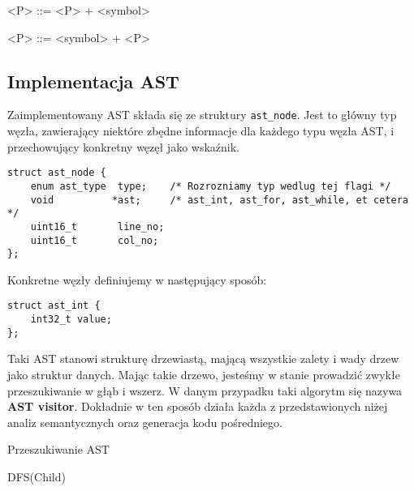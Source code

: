 			\begin{grammar}
			    <P> ::= <P> + <symbol>
	
			    <P> ::= <symbol> + <P>
			\end{grammar}

		\subsection{Implementacja AST}

			Zaimplementowany AST składa się ze struktury \texttt{ast_node}. Jest to główny typ
			węzła, zawierający niektóre zbędne informacje dla każdego typu węzła AST, i przechowujący
			konkretny węzęł jako wskaźnik.

			\spacing

\begin{lstlisting}[label={lst:ast-node}]
struct ast_node {
	enum ast_type  type;    /* Rozrozniamy typ wedlug tej flagi */
	void          *ast;     /* ast_int, ast_for, ast_while, et cetera */
	uint16_t       line_no;
	uint16_t       col_no;
};
\end{lstlisting}
			
			\spacing
			
			Konkretne węzły definiujemy w następujący sposób:

			\spacing

\begin{lstlisting}[label={lst:ast-concrete-node}]
struct ast_int {
	int32_t value;
};
\end{lstlisting}
			
			\spacing
			
			Taki AST stanowi strukturę drzewiastą, mającą wszystkie zalety i wady drzew jako struktur
			danych. Mając takie drzewo, jesteśmy w stanie prowadzić zwykłe przeszukiwanie w głąb
			i wszerz. W danym przypadku taki algorytm się nazywa \textbf{AST visitor}. Dokładnie w ten
			sposób działa każda z przedstawionych niżej analiz semantycznych
			oraz generacja kodu pośredniego.

			\spacing

			\begin{algorithm}
				\caption{Przeszukiwanie AST}
				\begin{algorithmic}[1]

						\State DFS(Child)
					\EndFor
				\EndProcedure

				\end{algorithmic}
			\end{algorithm}

